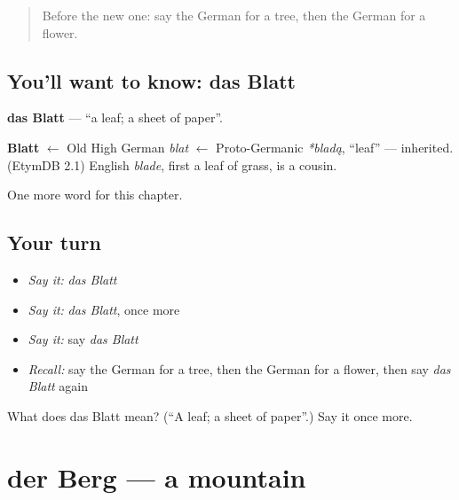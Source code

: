 \label{lesson:GE-C82-blatt}



\begin{quote}
Before the new one: say the German for a tree, then the German for a flower.
\end{quote}

\subsection*{You'll want to know: das Blatt}
\textbf{das Blatt} — \textquotedblleft{}a leaf; a sheet of paper\textquotedblright{}.

\begin{cousinweb}
\textbf{Blatt} $\leftarrow$ Old High German \emph{blat} $\leftarrow$ Proto-Germanic \emph{*bladą}, \textquotedblleft{}leaf\textquotedblright{} — inherited. (EtymDB 2.1) English \emph{blade}, first a leaf of grass, is a cousin.
\end{cousinweb}

\begin{grammarlens}[title={What you've built}]
One more word for this chapter.
\end{grammarlens}

\subsection*{Your turn}
\begin{itemize}
\raggedright
  \item \emph{Say it:} \emph{das Blatt}
  \item \emph{Say it:} \emph{das Blatt}, once more
  \item \emph{Say it:} say \emph{das Blatt}
  \item \emph{Recall:} say the German for a tree, then the German for a flower, then say \emph{das Blatt} again
\end{itemize}

\begin{tcolorbox}[breakable,colback=teal!4,colframe=teal!35!black,title={Before you move on}]
What does das Blatt mean? (\textquotedblleft{}A leaf; a sheet of paper\textquotedblright{}.) Say it once more.
\end{tcolorbox}
\section[der Berg]{der Berg — a mountain}

\label{lesson:GE-C82-berg}



